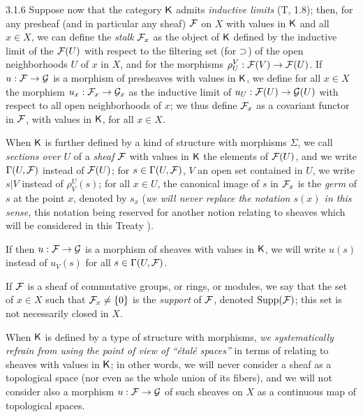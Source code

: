 \documentclass[../main.tex]{subfiles}
\begin{document}
\begin{env}{3.1.6}
Suppose now that the category $\mathsf{K}$ admits \emph{inductive limits} (T, 1.8);
then, for any presheaf (and in particular any sheaf) $\mathcal{F}$ on $X$ with
values in $\mathsf{K}$ and all $x\in X$, we can define the \emph{stalk} $\mathcal{F}_x$ as the object of $\mathsf{K}$ defined
by the inductive limit of the $\mathcal{F}(U)$ with respect to the filtering set
(for $\supset$) of the open neighborhoods $U$ of $x$ in $X$, and for the morphisms $\rho_U^V:\mathcal{F}(V)\to\mathcal{F}(U)$.
If $u:\mathcal{F}\to\mathcal{G}$ is a morphism of presheaves with values in $\mathsf{K}$, we define for all
$x\in X$ the morphism $u_x:\mathcal{F}_x\to\mathcal{G}_x$ as the inductive limit of $u_U:\mathcal{F}(U)\to\mathcal{G}(U)$ with respect to all
open neighborhoods of $x$; we thus define $\mathcal{F}_x$ as a covariant functor in $\mathcal{F}$, with values in $\mathsf{K}$, for
all $x\in X$.

When $\mathsf{K}$ is further defined by a kind of structure with morphisms $\Sigma$,
we call \emph{sections over $U$} of a \emph{sheaf} $\mathcal{F}$ with values in $\mathsf{K}$ the elements
of $\mathcal{F}(U)$, and we write $\Gamma(U,\mathcal{F})$ instead of $\mathcal{F}(U)$; for $s\in\Gamma(U,\mathcal{F})$, $V$ an open set
contained in $U$, we write $s|V$ instead of $\rho_V^U(s)$; for all $x\in U$, the canonical image
of $s$ in $\mathcal{F}_x$ is the \emph{germ} of $s$ at the point $x$, denoted by $s_x$ (\emph{we will never replace
the notation $s(x)$ in this sense,} this notation being reserved for another notion relating to sheaves
which will be considered in this Treaty ).

If then $u:\mathcal{F}\to\mathcal{G}$ is a morphism of sheaves with values in $\mathsf{K}$, we will write $u(s)$
instead of $u_V(s)$ for all $s\in\Gamma(U,\mathcal{F})$.

If $\mathcal{F}$ is a sheaf of commutative groups, or rings, or modules, we say
that the set of $x\in X$ such that $\mathcal{F}_x\neq\{0\}$ is the \emph{support} of $\mathcal{F}$, denoted
$\operatorname{Supp}(\mathcal{F})$; this set is not necessarily closed in $X$.

When $\mathsf{K}$ is defined by a type of structure with morphisms, \emph{we
systematically refrain from using the point of view of ``{\'e}tal{\'e} spaces''} in terms of
relating to sheaves with values in $\mathsf{K}$; in other words, we will never consider
a sheaf as a topological space (nor even as the whole union of its
fibers), and we will not consider also a morphism $u:\mathcal{F}\to\mathcal{G}$ of such sheaves
on $X$ as a continuous map of topological spaces.
\end{env}
\end{document}
